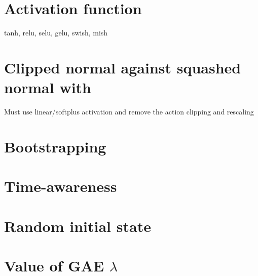 \section{Activation function}

tanh, relu, selu, gelu, swish, mish

\section{Clipped normal against squashed normal with \ppo}

Must use linear/softplus activation and remove the action clipping and rescaling

\section{Bootstrapping}

\section{Time-awareness}

\section{Random initial state}

\section{Value of GAE $\lambda$}

